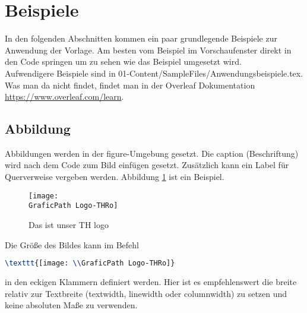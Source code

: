 \newpage
\section[Beispiele]{Beispiele}
\label{sec:Beispiele}
%
In den folgenden Abschnitten kommen ein paar grundlegende Beispiele zur Anwendung der Vorlage.
Am besten vom Beispiel im Vorschaufenster direkt in den Code springen um zu sehen wie das Beispiel umgesetzt wird.\\
Aufwendigere Beispiele sind in 01-Content/SampleFiles/Anwendungsbeispiele.tex.
Was man da nicht findet, findet man in der Overleaf Dokumentation \url{https://www.overleaf.com/learn}.
%
%
%
\subsection{Abbildung}
\label{sec:Beispiele_Abbildung}
%
Abbildungen werden in der figure-Umgebung gesetzt.
Die caption (Beschriftung) wird nach dem Code zum Bild einfügen gesetzt.
Zusätzlich kann ein Label für Querverweise vergeben werden. Abbildung \ref{fig:SampleFig} ist ein Beispiel.
%
\begin{figure}[bht]
    \centering
    \texttt{[image: \\GraficPath Logo-THRo]}
    \caption{Das ist unser TH logo}
    \label{fig:SampleFig}
\end{figure}
%
\par
Die Größe des Bildes kann im Befehl
\begin{lstlisting}[language=tex]
\texttt{[image: \\GraficPath Logo-THRo]}
\end{lstlisting}
in den eckigen Klammern definiert werden.
Hier ist es empfehlenswert die breite relativ zur Textbreite (textwidth, linewidth oder columnwidth) zu setzen und keine absoluten Maße zu verwenden.
%
%
%
